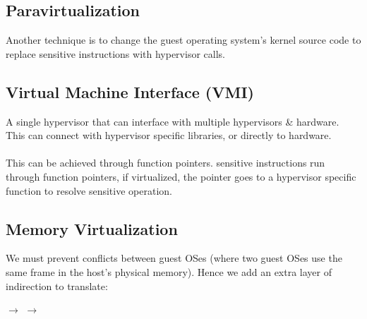 \documentclass{report}
\begin{document}
        \subsection*{Paravirtualization}
            Another technique is to change the guest operating system's kernel source code to replace sensitive instructions with hypervisor calls.
        \subsection*{Virtual Machine Interface (VMI)}
            A single hypervisor  that can interface with multiple hypervisors \& hardware. This  can connect with hypervisor specific libraries, or directly to hardware.
            \\
            \\ This can be achieved through function pointers. sensitive instructions run through function pointers, if virtualized, the pointer goes to a hypervisor specific function to resolve sensitive operation.

        \subsection*{Memory Virtualization}
            We must prevent conflicts between guest OSes (where two guest OSes use the same frame in the host's physical memory). Hence we add an extra layer of indirection to translate:
            \\ \centerline{ $\to$  $\to$ }
\end{document}
